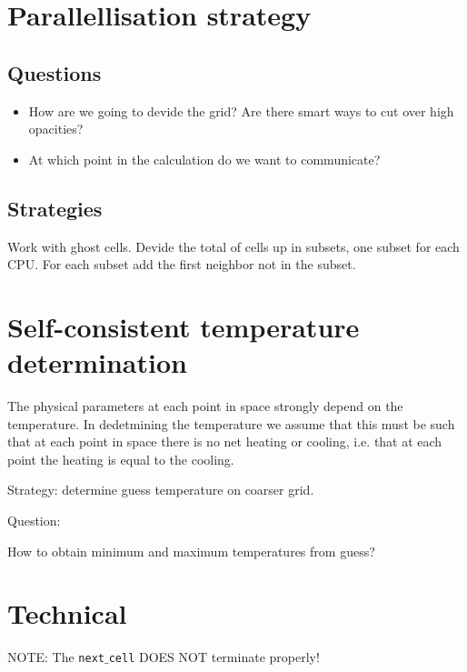 \documentclass[]{article}
\begin{document}
\section{Parallellisation strategy}


\subsection{Questions}

\begin{itemize}
\item How are we going to devide the grid? Are there smart ways to cut over high opacities?
\item At which point in the calculation do we want to communicate?
\end{itemize}

\subsection{Strategies}

Work with ghost cells. Devide the total of cells up in subsets, one subset for each CPU. For each subset add the first neighbor not in the subset.


\section{Self-consistent temperature determination}

The physical parameters at each point in space strongly depend on the temperature.
In dedetmining the temperature we assume that this must be such that at each point in space there is no net heating or cooling, i.e. that at each point the heating is equal to the cooling.

\bigskip

Strategy: determine guess temperature on coarser grid.

\bigskip

Question:

How to obtain minimum and maximum temperatures from guess?





\section{Technical}


NOTE: The \texttt{next$\_$cell} DOES NOT terminate properly!

\bigskip
\end{document}
